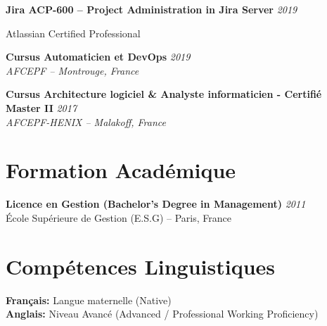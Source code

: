 \documentclass[11pt,a4paper]{article}
\begin{document}
\textbf{Jira ACP-600 -- Project Administration in Jira Server} \hfill \textit{2019}

Atlassian Certified Professional

\textbf{Cursus Automaticien et DevOps} \hfill \textit{2019}\\
\textit{AFCEPF -- Montrouge, France}

\textbf{Cursus Architecture logiciel \& Analyste informaticien - Certifié Master II} \hfill \textit{2017}\\
\textit{AFCEPF-HENIX -- Malakoff, France}

\section*{Formation Académique}

\textbf{Licence en Gestion (Bachelor's Degree in Management)} \hfill \textit{2011}\\
École Supérieure de Gestion (E.S.G) -- Paris, France

\section*{Compétences Linguistiques}

\textbf{Français:} Langue maternelle (Native)\\
\textbf{Anglais:} Niveau Avancé (Advanced / Professional Working Proficiency)
\end{document}
